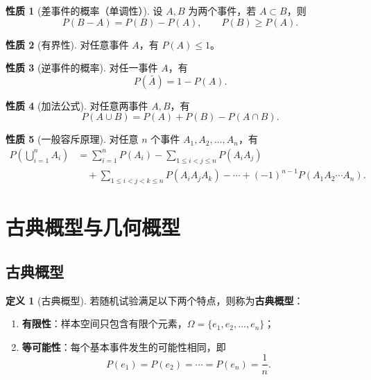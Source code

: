 \documentclass[11pt,a4paper]{report}
\theoremstyle{definition}
\newtheorem{definition}{定义}[chapter]
\newtheorem{property}{性质}[chapter]
\begin{document}
\begin{property}[差事件的概率（单调性）]
设 $A, B$ 为两个事件，若 $A \subset B$，则
\[
P(B - A) = P(B) - P(A), \qquad P(B) \geq P(A).
\]
\end{property}

\begin{property}[有界性]
对任意事件 $A$，有 $P(A) \leq 1$。
\end{property}

\begin{property}[逆事件的概率]
对任一事件 $A$，有
\[
\boxed{P(\bar{A}) = 1 - P(A)}.
\]
\end{property}

\begin{property}[加法公式]
对任意两事件 $A, B$，有
\[
\boxed{P(A \cup B) = P(A) + P(B) - P(A \cap B)}.
\]
\end{property}

\begin{property}[一般容斥原理]
对任意 $n$ 个事件 $A_1, A_2, \dots, A_n$，有
\begin{align*}
P\left(\bigcup_{i=1}^{n} A_i\right) &= \sum_{i=1}^{n} P(A_i) - \sum_{1 \leq i < j \leq n} P(A_i A_j) \\
&\quad + \sum_{1 \leq i < j < k \leq n} P(A_i A_j A_k) - \cdots + (-1)^{n-1} P(A_1 A_2 \cdots A_n).
\end{align*}
\end{property}

\section{古典概型与几何概型}

\subsection{古典概型}

\begin{definition}[古典概型]
若随机试验满足以下两个特点，则称为\textbf{古典概型}：
\begin{enumerate}[label=(\arabic*),leftmargin=2em]
    \item \textbf{有限性}：样本空间只包含有限个元素，$\Omega = \{e_1, e_2, \dots, e_n\}$；
    \item \textbf{等可能性}：每个基本事件发生的可能性相同，即
    \[
    P(e_1) = P(e_2) = \cdots = P(e_n) = \frac{1}{n}.
    \]
\end{enumerate}
\end{definition}
\end{document}
